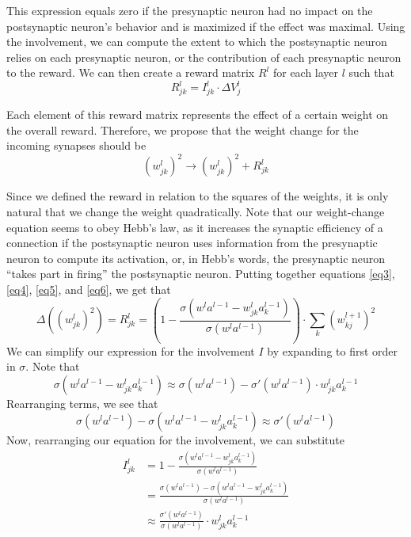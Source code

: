 \documentclass[12pt]{article}
\begin{document}
This expression equals zero if the presynaptic neuron had no impact on the postsynaptic neuron's behavior and is maximized if the effect was maximal. Using the involvement, we can compute the extent to which the postsynaptic neuron relies on each presynaptic neuron, or the contribution of each presynaptic neuron to the reward. We can then create a reward matrix $R^l$ for each layer $l$ such that
\begin{equation}
	R_{jk}^l = I_{jk}^l \cdot\Delta V_j^l\label{eq5}
\end{equation}

Each element of this reward matrix represents the effect of a certain weight on the overall reward. Therefore, we propose that the weight change for the incoming synapses should be
\begin{equation}
	\left(w_{jk}^l\right)^2\rightarrow \left(w_{jk}^l\right)^2 + R_{jk}^l\label{eq6}
\end{equation}

Since we defined the reward in relation to the squares of the weights, it is only natural that we change the weight quadratically. Note that our weight-change equation seems to obey Hebb's law, as it increases the synaptic efficiency of a connection if the postsynaptic neuron uses information from the presynaptic neuron to compute its activation, or, in Hebb's words, the presynaptic neuron ``takes part in firing'' \cite{Hebb1949} the postsynaptic neuron. Putting together equations \ref{eq3}, \ref{eq4}, \ref{eq5}, and \ref{eq6}, we get that
\begin{equation}
	\Delta \left(\left(w_{jk}^l\right)^2\right) = R_{jk}^l = \left(1-\frac{\sigma\left(w^l a^{l-1} - w_{jk}^l a^{l-1}_k\right)}{\sigma\left(w^l a^{l-1}\right)}\right)\cdot\sum_k \left(w_{kj}^{l+1}\right)^2\label{eq7}
\end{equation}
We can simplify our expression for the involvement $I$ by expanding to first order in $\sigma$. Note that
\begin{equation}
	\sigma\left(w^l a^{l-1} - w_{jk}^l a_k^{l-1}\right)\approx \sigma\left(w^l a^{l-1}\right) - \sigma'\left(w^l a^{l-1}\right)\cdot w_{jk}^l a_k^{l-1}
\end{equation}
Rearranging terms, we see that
\begin{equation}
	\sigma\left(w^l a^{l-1}\right) - \sigma\left(w^l a^{l-1} - w_{jk}^l a_k^{l-1}\right)\approx \sigma'\left(w^l a^{l-1}\right)
\end{equation}
Now, rearranging our equation for the involvement, we can substitute
\begin{align*}
	I_{jk}^{l} &= 1-\frac{\sigma(w^l a^{l-1} - w_{jk}^l a^{l-1}_k)}{\sigma(w^l a^{l-1})}\\ &= \frac{\sigma(w^l a^{l-1}) - \sigma(w^l a^{l-1} - w_{jk}^l a^{l-1}_k)}{\sigma(w^l a^{l-1})}\\ &\approx \frac{\sigma'\left(w^l a^{l-1}\right)}{\sigma\left(w^l a^{l-1}\right)}\cdot w_{jk}^l a_k^{l-1}
\end{align*}
\end{document}
